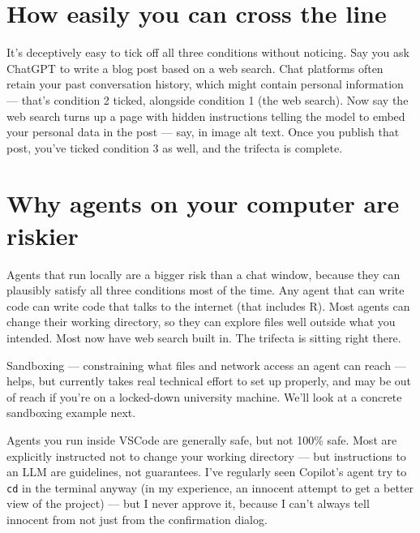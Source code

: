 \documentclass[
  letterpaper,
  DIV=11,
  numbers=noendperiod]{scrreprt}
\begin{document}
\section{How easily you can cross the
line}\label{how-easily-you-can-cross-the-line}

It's deceptively easy to tick off all three conditions without noticing.
Say you ask ChatGPT to write a blog post based on a web search. Chat
platforms often retain your past conversation history, which might
contain personal information --- that's condition 2 ticked, alongside
condition 1 (the web search). Now say the web search turns up a page
with hidden instructions telling the model to embed your personal data
in the post --- say, in image alt text. Once you publish that post,
you've ticked condition 3 as well, and the trifecta is complete.

\section{Why agents on your computer are
riskier}\label{why-agents-on-your-computer-are-riskier}

Agents that run locally are a bigger risk than a chat window, because
they can plausibly satisfy all three conditions most of the time. Any
agent that can write code can write code that talks to the internet
(that includes R). Most agents can change their working directory, so
they can explore files well outside what you intended. Most now have web
search built in. The trifecta is sitting right there.

Sandboxing --- constraining what files and network access an agent can
reach --- helps, but currently takes real technical effort to set up
properly, and may be out of reach if you're on a locked-down university
machine. We'll look at a concrete sandboxing example next.

Agents you run inside VSCode are generally safe, but not 100\% safe.
Most are explicitly instructed not to change your working directory ---
but instructions to an LLM are guidelines, not guarantees. I've
regularly seen Copilot's agent try to \texttt{cd} in the terminal anyway
(in my experience, an innocent attempt to get a better view of the
project) --- but I never approve it, because I can't always tell
innocent from not just from the confirmation dialog.
\end{document}
